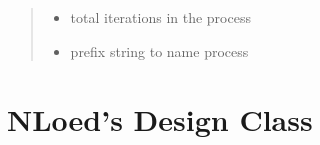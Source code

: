 \documentclass[letterpaper,10pt,english,openany,oneside]{sphinxmanual}
\begin{document}
\begin{fulllineitems}
\begin{fulllineitems}
\begin{quote}
\begin{description}
\begin{itemize}
\item {} 
 \textendash{} total iterations in the process

\item {} 
 \textendash{} prefix string to name process

\end{itemize}

\end{description}\end{quote}

\end{fulllineitems}


\end{fulllineitems}



\chapter{NLoed’s Design Class}
\label{\detokenize{nloed:module-nloed.design}}\label{\detokenize{nloed:nloed-s-design-class}}
\end{document}
